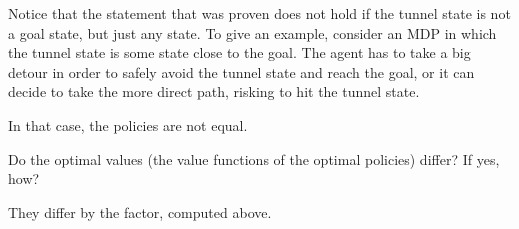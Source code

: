 \begin{enumerate}
\begin{solution}
Notice that the statement that was proven does not hold if the tunnel state is not a goal state, but just any state.
To give an example, consider an MDP in which the tunnel state is some state close to the goal. The agent has to
take a big detour in order to safely avoid the tunnel state and reach the goal, or it can decide to take the more
direct path, risking to hit the tunnel state.

In that case, the policies are not equal.
\end{solution}

Do the optimal values (the value functions of the optimal policies) differ? If yes, how?

\begin{solution}
They differ by the factor, computed above.
\end{solution}

\end{enumerate}
   


\exerfoot
